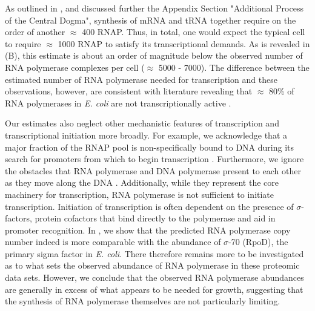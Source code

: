 As outlined in , and discussed further the Appendix
Section "Additional Process of the Central Dogma", synthesis of mRNA and tRNA together require
on the order of another $\approx$ 400 RNAP. Thus, in total, one would expect the
typical cell to require $\approx$ 1000 RNAP to satisfy its transcriptional
demands. As is revealed in (B), this estimate is about an
order of magnitude below the observed number of RNA polymerase complexes per
cell ($\approx$ 5000 - 7000). The difference between the estimated number of
RNA polymerase needed for transcription and these observations, however, are
consistent with literature revealing that $\approx$ 80\% of RNA
polymerases in \textit{E. coli} are not transcriptionally active
\citep{patrick2015}.

Our estimates also neglect other mechanistic features of transcription and
transcriptional initiation more broadly. For example, we acknowledge that a
major fraction of the RNAP pool is non-specifically bound to DNA during its
search for promoters from which to begin transcription \citep{klumpp2008}.
Furthermore, we ignore the obstacles that RNA polymerase and DNA polymerase
present to each other as they move along the DNA \citep{finkelstein2013}.
Additionally, while they represent the core machinery for transcription, RNA
polymerase is not sufficient to initiate transcription. Initiation of
transcription is often dependent on the presence of $\sigma$-factors, protein
cofactors that bind directly to the polymerase \citep{browning2016} and aid in
promoter recognition. In , we show that the
predicted RNA polymerase copy number indeed is more comparable with the
abundance of $\sigma$-70 (RpoD), the primary sigma factor in \textit{E. coli}.
There therefore remains more to be investigated as to what sets the observed
abundance of RNA polymerase in these proteomic data sets. However, we conclude
that the observed RNA polymerase abundances are generally in excess of what
appears to be needed for growth, suggesting that the synthesis of RNA polymerase
themselves are not particularly limiting.

